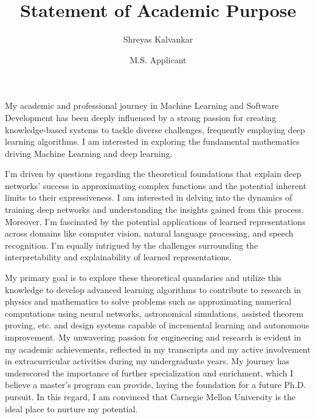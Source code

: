 \documentclass{article}
\title{Statement of Academic Purpose}
\author{Shreyas Kalvankar}
\date{M.S. Applicant}
\begin{document}
  \maketitle%
  \thispagestyle{empty}
My academic and professional journey in Machine Learning and Software
Development has been deeply influenced by a strong passion for creating
knowledge-based systems to tackle diverse challenges, frequently employing deep
learning algorithms. I am interested in exploring the fundamental mathematics
driving Machine Learning and deep learning.

I'm driven by questions regarding the theoretical foundations that explain deep
networks' success in approximating complex functions and the potential inherent
limits to their expressiveness. I am interested in delving into the dynamics of
training deep networks and understanding the insights gained from this process.
Moreover, I'm fascinated by the potential applications of learned
representations across domains like computer vision, natural language
processing, and speech recognition. I'm equally intrigued by the challenges
surrounding the interpretability and explainability of learned
representations.

My primary goal is to explore these theoretical quandaries and utilize this
knowledge to develop advanced learning algorithms to contribute to research in
physics and mathematics to solve problems such as approximating numerical
computations using neural networks, astronomical simulations, assisted theorem
proving, etc. and design systems capable of incremental learning and autonomous
improvement. My unwavering passion for engineering and research is evident in my
academic achievements, reflected in my transcripts and my active involvement in
extracurricular activities during my undergraduate years. My journey has
underscored the importance of further specialization and enrichment, which I
believe a master's program can provide, laying the foundation for a future Ph.D.
pursuit. In this regard, I am convinced that Carnegie Mellon University is the
ideal place to nurture my potential.
\end{document}
